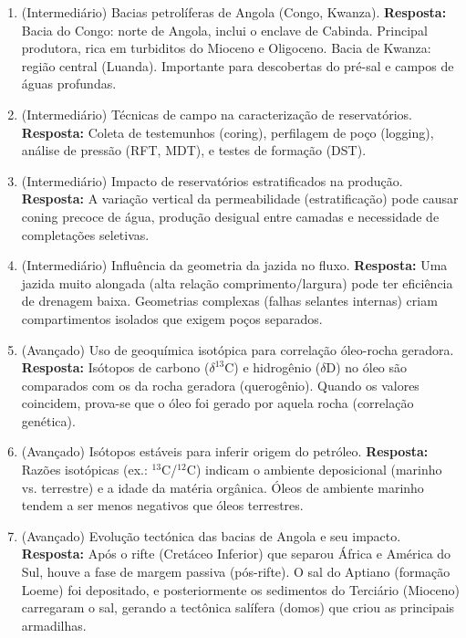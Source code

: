\documentclass[11pt,a4paper]{article}
\begin{document}
\begin{enumerate}
  \item (Intermediário) Bacias petrolíferas de Angola (Congo, Kwanza).
  \textbf{Resposta:} Bacia do Congo: norte de Angola, inclui o enclave de Cabinda. Principal produtora, rica em turbiditos do Mioceno e Oligoceno. Bacia de Kwanza: região central (Luanda). Importante para descobertas do pré-sal e campos de águas profundas.

  \item (Intermediário) Técnicas de campo na caracterização de reservatórios.
  \textbf{Resposta:} Coleta de testemunhos (coring), perfilagem de poço (logging), análise de pressão (RFT, MDT), e testes de formação (DST).

  \item (Intermediário) Impacto de reservatórios estratificados na produção.
  \textbf{Resposta:} A variação vertical da permeabilidade (estratificação) pode causar coning precoce de água, produção desigual entre camadas e necessidade de completações seletivas.

  \item (Intermediário) Influência da geometria da jazida no fluxo.
  \textbf{Resposta:} Uma jazida muito alongada (alta relação comprimento/largura) pode ter eficiência de drenagem baixa. Geometrias complexas (falhas selantes internas) criam compartimentos isolados que exigem poços separados.

  \item (Avançado) Uso de geoquímica isotópica para correlação óleo-rocha geradora.
  \textbf{Resposta:} Isótopos de carbono ($\delta^{13}$C) e hidrogênio ($\delta$D) no óleo são comparados com os da rocha geradora (querogênio). Quando os valores coincidem, prova-se que o óleo foi gerado por aquela rocha (correlação genética).

  \item (Avançado) Isótopos estáveis para inferir origem do petróleo.
  \textbf{Resposta:} Razões isotópicas (ex.: $^{13}$C/$^{12}$C) indicam o ambiente deposicional (marinho vs. terrestre) e a idade da matéria orgânica. Óleos de ambiente marinho tendem a ser menos negativos que óleos terrestres.

  \item (Avançado) Evolução tectónica das bacias de Angola e seu impacto.
  \textbf{Resposta:} Após o rifte (Cretáceo Inferior) que separou África e América do Sul, houve a fase de margem passiva (pós-rifte). O sal do Aptiano (formação Loeme) foi depositado, e posteriormente os sedimentos do Terciário (Mioceno) carregaram o sal, gerando a tectônica salífera (domos) que criou as principais armadilhas.


\end{enumerate}
\end{document}
